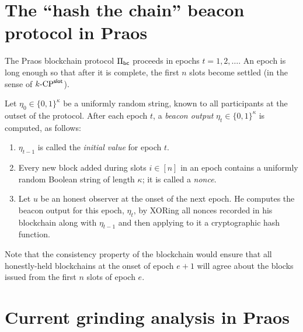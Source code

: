\section{The ``hash the chain'' beacon protocol in Praos}\label{sec:praos-beacon-def}
The Praos blockchain protocol $\Pi_\mathsf{bc}$ 
proceeds in epochs $t = 1, 2, \ldots$. 
An epoch is long enough 
so that after it is complete, 
the first $n$ slots become settled 
(in the sense of ${k}\text{-}\mathrm{CP}^{\mathsf{slot}}$).


\begin{definition}\label{def:praos-beacon}
  Let $\eta_0 \in \{0,1\}^\kappa$ be a uniformly random string, known to all participants 
  at the outset of the protocol.
  After each epoch $t$, 
  a \emph{beacon output} $\eta_t \in \{0,1\}^\kappa$ is computed, as follows: 
  \begin{enumerate}
    \item $\eta_{t-1}$ is called the \emph{initial value} for epoch $t$.

    \item Every new block added during slots $i \in [n]$ in an epoch contains 
    a uniformly random Boolean string of length $\kappa$; 
    it is called a \emph{nonce}.

    \item Let $u$ be an honest observer at the onset of the next epoch. 
    He computes the beacon output for this epoch, $\eta_t$, 
    by XORing all nonces recorded in his blockchain 
    along with $\eta_{t-1}$ 
    and then applying to it a cryptographic hash function.
  \end{enumerate}
  Note that the consistency property of the blockchain 
  would ensure that all honestly-held blockchains 
  at the onset of epoch $e + 1$ 
  will agree about the blocks issued from 
  the first $n$ slots of epoch $e$.  
\end{definition}




\section{Current grinding analysis in Praos}


